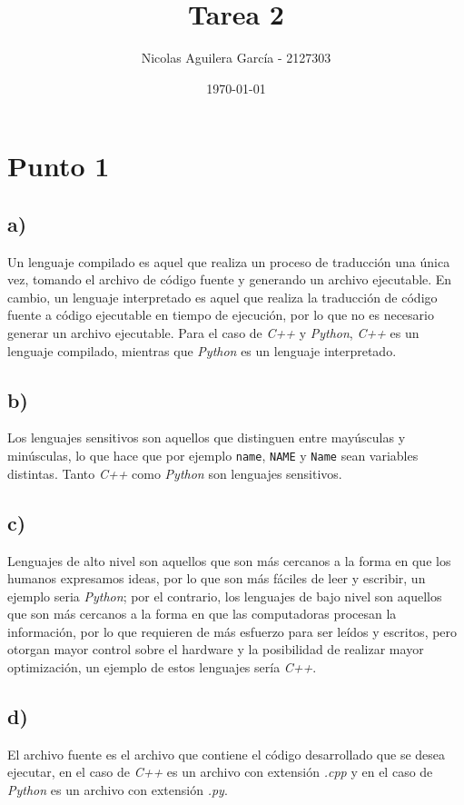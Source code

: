 \documentclass[10pt]{article}
\title{Tarea 2}
\author{Nicolas Aguilera García - 2127303}
\date{\today}
\begin{document}
    \maketitle

    \section*{Punto 1}
        \subsection*{a)}
        Un lenguaje compilado es aquel que realiza un proceso de traducción una única vez, tomando el archivo de código fuente y generando un archivo ejecutable. En cambio, un lenguaje interpretado es aquel que realiza la traducción de código fuente a código ejecutable en tiempo de ejecución, por lo que no es necesario generar un archivo ejecutable. Para el caso de \textit{C++} y \textit{Python}, \textit{C++} es un lenguaje compilado, mientras que \textit{Python} es un lenguaje interpretado.

        \subsection*{b)}
        Los lenguajes sensitivos son aquellos que distinguen entre mayúsculas y minúsculas, lo que hace que por ejemplo \texttt{name}, \texttt{NAME} y \texttt{Name} sean variables distintas. Tanto \textit{C++} como \textit{Python} son lenguajes sensitivos.

        \subsection*{c)}
        Lenguajes de alto nivel son aquellos que son más cercanos a la forma en que los humanos expresamos ideas, por lo que son más fáciles de leer y escribir, un ejemplo seria \textit{Python}; por el contrario, los lenguajes de bajo nivel son aquellos que son más cercanos a la forma en que las computadoras procesan la información, por lo que requieren de más esfuerzo para ser leídos y escritos, pero otorgan mayor control sobre el hardware y la posibilidad de realizar mayor optimización, un ejemplo de estos lenguajes sería \textit{C++}.

        \subsection*{d)}
        El archivo fuente es el archivo que contiene el código desarrollado que se desea ejecutar, en el caso de \textit{C++} es un archivo con extensión \textit{.cpp} y en el caso de \textit{Python} es un archivo con extensión \textit{.py}.
\end{document}

